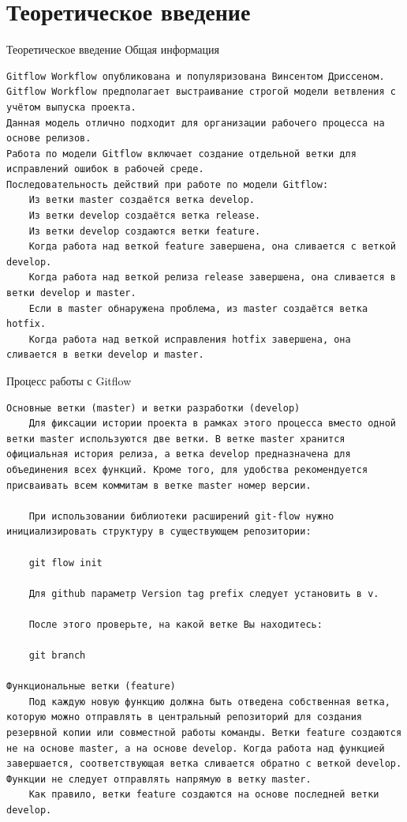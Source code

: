 \documentclass[
  ignorenonframetext,
  aspectratio=169,
  russian,
]{beamer}
\begin{document}
\section{Теоретическое
введение}\label{ux442ux435ux43eux440ux435ux442ux438ux447ux435ux441ux43aux43eux435-ux432ux432ux435ux434ux435ux43dux438ux435}

\begin{frame}[fragile]{Теоретическое введение}
Общая информация

\begin{verbatim}
Gitflow Workflow опубликована и популяризована Винсентом Дриссеном.
Gitflow Workflow предполагает выстраивание строгой модели ветвления с учётом выпуска проекта.
Данная модель отлично подходит для организации рабочего процесса на основе релизов.
Работа по модели Gitflow включает создание отдельной ветки для исправлений ошибок в рабочей среде.
Последовательность действий при работе по модели Gitflow:
    Из ветки master создаётся ветка develop.
    Из ветки develop создаётся ветка release.
    Из ветки develop создаются ветки feature.
    Когда работа над веткой feature завершена, она сливается с веткой develop.
    Когда работа над веткой релиза release завершена, она сливается в ветки develop и master.
    Если в master обнаружена проблема, из master создаётся ветка hotfix.
    Когда работа над веткой исправления hotfix завершена, она сливается в ветки develop и master.
\end{verbatim}

Процесс работы с Gitflow

\begin{verbatim}
Основные ветки (master) и ветки разработки (develop)
    Для фиксации истории проекта в рамках этого процесса вместо одной ветки master используются две ветки. В ветке master хранится официальная история релиза, а ветка develop предназначена для объединения всех функций. Кроме того, для удобства рекомендуется присваивать всем коммитам в ветке master номер версии.

    При использовании библиотеки расширений git-flow нужно инициализировать структуру в существующем репозитории:

    git flow init

    Для github параметр Version tag prefix следует установить в v.

    После этого проверьте, на какой ветке Вы находитесь:

    git branch

Функциональные ветки (feature)
    Под каждую новую функцию должна быть отведена собственная ветка, которую можно отправлять в центральный репозиторий для создания резервной копии или совместной работы команды. Ветки feature создаются не на основе master, а на основе develop. Когда работа над функцией завершается, соответствующая ветка сливается обратно с веткой develop. Функции не следует отправлять напрямую в ветку master.
    Как правило, ветки feature создаются на основе последней ветки develop.


\end{verbatim}
\end{frame}
\end{document}
